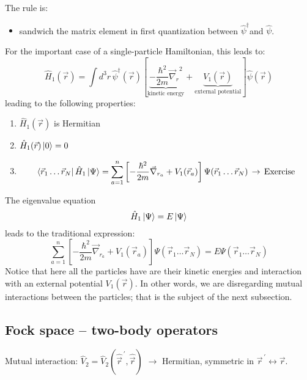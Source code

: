 \documentclass[12pt]{article}
\newcommand{\be}{\begin{equation}}
\newcommand{\ee}{\end{equation}}
\newcommand{\vecrp}{\ensuremath{\vec{r}^{\,\prime}}}
\newcommand{\vecnr}{\ensuremath{\vec{\nabla}_{\!r}}}
\begin{document}
The rule is: 
\begin{itemize}
\item sandwich the matrix element in first
quantization between $\hat{\psi}^{\dagger}$and $\hat{\psi}$.
\end{itemize}
For the important case of a single-particle
Hamiltonian, this leads to:
\be
\hat{H}_1(\vec{r}) = \int d^3r\,
\hat{\psi}^\dagger(\vec{r})
\left[
\underbrace{-\frac{\hbar^2}{2m}\vecnr^2}_{\text{kinetic energy}} 
+ 
\underbrace{V_1(\vec{r})}_{\text{external potential}} 
\right]
\hat{\psi}(\vec{r})
\ee
leading to the following properties:
\begin{enumerate}
\item $\hat{H}_1(\vec{r})$ is Hermitian
%
\item $\hat{H}_1(\vec{r})\ket{0}=0$
%
\item
\be
\bra{\vec{r}_1\ldots\vec{r}_N}\hat{H}_1\ket{\Psi} =
\sum_{a=1}^n
\left[
-\frac{\hbar^2}{2m} \vec{\nabla}_{r_a} + V_1(\vec{r}_a)
\right]
\Psi(\vec{r}_1\ldots\vec{r}_N)\,\to\,\text{Exercise}
\ee
\end{enumerate}
The eigenvalue equation
\[
\hat{H}_1\ket{\Psi} = E\ket{\Psi}
\]
leads to the traditional expression:
\be
\sum_{a=1}^n
\left[
-\frac{\hbar^2}{2m} \vec{\nabla}_{r_a} + V_1(\vec{r}_a)
\right] \Psi(\vec{r}_1\ldots\vec{r}_N)
= E \Psi(\vec{r}_1\ldots\vec{r}_N)
\ee
Notice that here all the particles have are their kinetic energies 
and interaction with an external potential $V_1(\vec{r})$.
In other words, we are disregarding mutual interactions between the particles;
that is the subject of the next subsection.

\subsection{Fock space -- two-body operators}

Mutual interaction: $\hat{V}_2 = \hat{V}_2(\hat{\vec{r}}^{\,\prime},\hat{\vec{r}})$
$\to$ Hermitian, symmetric in $\vecrp \leftrightarrow \vec{r}$.

\end{document}
